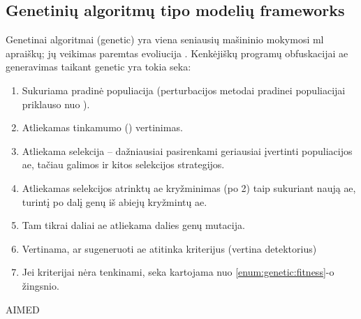 \subsection{Genetinių algoritmų tipo modelių \glspl{framework}}\label{sec:literature:genetic}

Genetinai algoritmai (\acs{genetic}) yra viena seniausių mašininio mokymosi
\acs{ml} apraiškų; jų veikimas paremtas evoliucija \cite{castroAIMEDEvolvingMalware2019}. Kenkėjiškų
programų obfuskacijai \acs{ae} generavimas taikant \acs{genetic} yra tokia
seka:
\begin{enumerate}
    \item Sukuriama pradinė populiacija (perturbacijos metodai pradinei populiacijai
          priklauso nuo ).
    \item Atliekamas tinkamumo () vertinimas.\label{enum:genetic:fitness}
    \item Atliekama selekcija -- dažniausiai pasirenkami geriausiai įvertinti
          populiacijos \acs{ae}, tačiau galimos ir kitos selekcijos strategijos.
    \item Atliekamas selekcijos atrinktų \acs{ae} kryžminimas (po 2) taip sukuriant naują
          \acs{ae}, turintį po dalį genų iš abiejų kryžmintų \acs{ae}.
    \item Tam tikrai daliai \ac{ae} atliekama dalies genų mutacija.
    \item Vertinama, ar sugeneruoti \acs{ae} atitinka kriterijus (vertina detektorius)
    \item Jei kriterijai nėra tenkinami, seka kartojama nuo \ref{enum:genetic:fitness}-o
          žingsnio.
\end{enumerate}
\cite{yusteOptimizationCodeCaves2022}

\begin{describeFramework}{AIMED}{\cite{castroAIMEDEvolvingMalware2019}}
     
\end{describeFramework}

